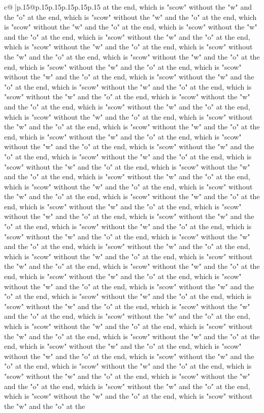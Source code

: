 \documentclass{article}
\begin{document}
{\begin{supertabular}{c@{$\;$}|p{.15\linewidth}@{}p{.15\linewidth}p{.15\linewidth}p{.15\linewidth}p{.15\linewidth}p{.15\linewidth}}
{{{at the end, which is "scow" without the "w" and the "o" at the end, which is "scow" without the "w" and the "o" at the end, which is "scow" without the "w" and the "o" at the end, which is "scow" without the "w" and the "o" at the end, which is "scow" without the "w" and the "o" at the end, which is "scow" without the "w" and the "o" at the end, which is "scow" without the "w" and the "o" at the end, which is "scow" without the "w" and the "o" at the end, which is "scow" without the "w" and the "o" at the end, which is "scow" without the "w" and the "o" at the end, which is "scow" without the "w" and the "o" at the end, which is "scow" without the "w" and the "o" at the end, which is "scow" without the "w" and the "o" at the end, which is "scow" without the "w" and the "o" at the end, which is "scow" without the "w" and the "o" at the end, which is "scow" without the "w" and the "o" at the end, which is "scow" without the "w" and the "o" at the end, which is "scow" without the "w" and the "o" at the end, which is "scow" without the "w" and the "o" at the end, which is "scow" without the "w" and the "o" at the end, which is "scow" without the "w" and the "o" at the end, which is "scow" without the "w" and the "o" at the end, which is "scow" without the "w" and the "o" at the end, which is "scow" without the "w" and the "o" at the end, which is "scow" without the "w" and the "o" at the end, which is "scow" without the "w" and the "o" at the end, which is "scow" without the "w" and the "o" at the end, which is "scow" without the "w" and the "o" at the end, which is "scow" without the "w" and the "o" at the end, which is "scow" without the "w" and the "o" at the end, which is "scow" without the "w" and the "o" at the end, which is "scow" without the "w" and the "o" at the end, which is "scow" without the "w" and the "o" at the end, which is "scow" without the "w" and the "o" at the end, which is "scow" without the "w" and the "o" at the end, which is "scow" without the "w" and the "o" at the end, which is "scow" without the "w" and the "o" at the end, which is "scow" without the "w" and the "o" at the end, which is "scow" without the "w" and the "o" at the end, which is "scow" without the "w" and the "o" at the end, which is "scow" without the "w" and the "o" at the end, which is "scow" without the "w" and the "o" at the end, which is "scow" without the "w" and the "o" at the end, which is "scow" without the "w" and the "o" at the end, which is "scow" without the "w" and the "o" at the end, which is "scow" without the "w" and the "o" at the end, which is "scow" without the "w" and the "o" at the end, which is "scow" without the "w" and the "o" at the end, which is "scow" without the "w" and the "o" at the end, which is "scow" without the "w" and the "o" at the end, which is "scow" without the "w" and the "o" at the end, which is "scow" without the "w" and the "o" at the end, which is "scow" without the "w" and the "o" at the end, which is "scow" without the "w" and the "o" at the end, which is "scow" without the "w" and the "o" at the end, which is "scow" without the "w" and the "o" at the end, which is "scow" without the "w" and the "o" at the }}}
\end{supertabular}}
\end{document}
